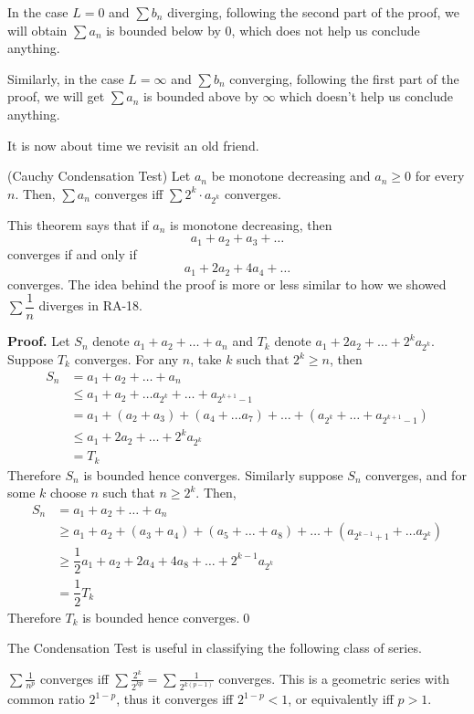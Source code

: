 In the case $L = 0$ and $\sum b_n$ diverging, following the second part of the proof, we will obtain $\sum a_n$ is bounded below by $0$, which does not help us conclude anything.

Similarly, in the case $L = \infty$ and $\sum b_n$ converging, following the first part of the proof, we will get $\sum a_n$ is bounded above by $\infty$ which doesn't help us conclude anything.

It is now about time we revisit an old friend.
\begin{SNP}{\thm}{(Cauchy Condensation Test) Let $a_n$ be monotone decreasing and $a_n \geq 0$ for every $n$. Then, $\sum a_n$ converges iff $\sum 2^k\cdot a_{2^k}$ converges.}
\end{SNP}
This theorem says that if $a_n$ is monotone decreasing, then
$$
a_1 + a_2 + a_3 + \ldots
$$
converges if and only if
$$
a_1 + 2a_2 + 4a_4 + \ldots
$$
converges. The idea behind the proof is more or less similar to how we showed $\sum \dfrac 1 n$ diverges in RA-18.
\begin{smrg}\textbf{Proof.} Let $S_n$ denote $a_1 + a_2 + \dots + a_n$ and $T_k$ denote $a_1 + 2a_2 + \dots + 2^ka_{2^k}$. Suppose $T_k$ converges. For any $n$, take $k$ such that $2^k \geq n$, then
\begin{align*}
S_n &= a_1 + a_2 + \dots + a_n\\
    &\leq a_1 + a_2 + \dots a_{2^k} + \dots + a_{2^{k + 1} - 1}\\
    &= a_1 + (a_2 + a_3) + (a_4 + \dots a_7) + \dots + (a_{2^k} + \dots + a_{2^{k + 1} - 1})\\
    &\leq a_1 + 2a_2 + \dots + 2^ka_{2^k}\\
    &= T_k
\end{align*}
Therefore $S_n$ is bounded hence converges. Similarly suppose $S_n$ converges, and for some $k$ choose $n$ such that $n \geq 2^k$. Then,
\begin{align*}
S_n &= a_1 + a_2 + \dots + a_n\\
    &\geq a_1 + a_2 + (a_3 + a_4) + (a_5 + \dots + a_8) + \dots + (a_{2^{k - 1} + 1} + \dots a_{2^k})\\
    &\geq \dfrac1 2 a_1 + a_2 + 2a_4 + 4a_8 + \dots + 2^{k-1}a_{2^k}\\
    &= \dfrac 1 2 T_k
\end{align*}
Therefore $T_k$ is bounded hence converges.\qed
\end{smrg}
The Condensation Test is useful in classifying the following class of series.
\begin{SNP}{\xmp}$\sum \frac{1}{n^p}$ converges iff $\sum \frac{2^k}{2^{kp}} = \sum \frac{1}{2^{k(p - 1)}}$ converges. This is a geometric series with common ratio $2^{1 - p}$, thus it converges iff $2^{1 - p} < 1$, or equivalently iff $p > 1$.
\end{SNP}
